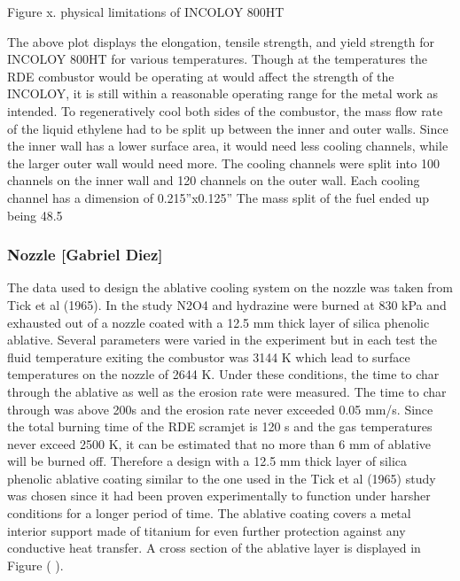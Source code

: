 Figure x. physical limitations of INCOLOY 800HT

            The above plot displays the elongation, tensile strength, and yield strength for INCOLOY 800HT for various temperatures. Though at the temperatures the RDE combustor would be operating at would affect the strength of the INCOLOY, it is still within a reasonable operating range for the metal work as intended.
            To regeneratively cool both sides of the combustor, the mass flow rate of the liquid ethylene had to be split up between the inner and outer walls. Since the inner wall has a lower surface area, it would need less cooling channels, while the larger outer wall would need more. The cooling channels were split into 100 channels on the inner wall and 120 channels on the outer wall. Each cooling channel has a dimension of 0.215”x0.125” The mass split of the fuel ended up being 48.5%

\subsubsection{Nozzle [Gabriel Diez]}

            The data used to design the ablative cooling system on the nozzle was taken from Tick et al (1965). In the study N2O4 and hydrazine were burned at 830 kPa and exhausted out of a nozzle coated with a 12.5 mm thick layer of silica phenolic ablative. Several parameters were varied in the experiment but in each test the fluid temperature exiting the combustor was 3144 K which lead to surface temperatures on the nozzle of 2644 K. Under these conditions, the time to char through the ablative as well as the erosion rate were measured. The time to char through was above 200s and the erosion rate never exceeded 0.05 mm/s. Since the total burning time of the RDE scramjet is 120 s and the gas temperatures never exceed 2500 K, it can be estimated that no more than 6 mm of ablative will be burned off. Therefore a design with a 12.5 mm thick layer of silica phenolic ablative coating similar to the one used in the Tick et al (1965) study was chosen since it had been proven experimentally to function under harsher conditions for a longer period of time. The ablative coating covers a metal interior support made of titanium for even further protection against any conductive heat transfer. A cross section of the ablative layer is displayed in Figure ( ).